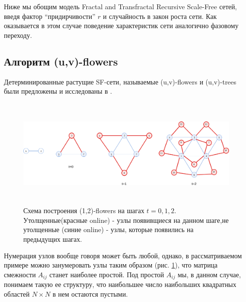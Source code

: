 \documentclass[10pt,aps,pra]{revtex4-1}
\begin{document}
Ниже мы обощим модель Fractal and Transfractal Recursive Scale-Free сетей, введя фактор ``придирчивости'' $r$ и случайность в закон роста сети. Как оказывается в этом случае поведение характеристик сети аналогично фазовому переходу.

\subsection{Алгоритм (u,v)-flowers}
Детерминированные растущие SF-сети, называемые (u,v)-flowers и (u,v)-trees были предложены и исследованы в \cite{Dor1,Rozenfeld1,Rozenfeld2}.

\begin{figure}[H]
\label{fig:flowerGraph}
\centering
\includegraphics[height=5.5cm]{graphics/hierarhical.png}
\caption{Схема построения (1,2)-flowers на шагах $t=0,1,2$. Утолщенные(красные online) - узлы появивщиеся на данном шаге,не утолщенные (синие online) - узлы, которые появились на предыдущих шагах.}
\end{figure}

Нумерация узлов вообще говоря может быть любой, однако, в рассматриваемом примере можно занумеровать узлы таким образом (рис. \ref{fig:flowerGraph}), что матрица смежности $A_{ij}$ станет наиболее простой. Под простой $A_{ij}$ мы, в данном случае, понимаем такую ее структуру, что наибольшее число наибольших квадратных областей $N \times N$ в нем остаются пустыми.
\end{document}
